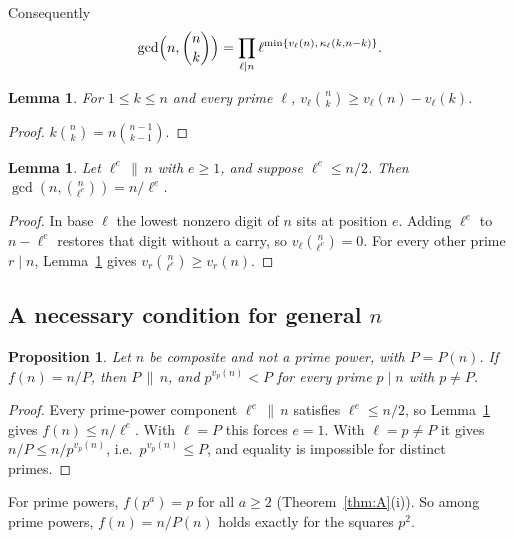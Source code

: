 \documentclass[11pt,a4paper]{article}
\newtheorem{lemma}[theorem]{Lemma}
\newtheorem{proposition}[theorem]{Proposition}
\theoremstyle{definition}
\begin{document}
Consequently
\begin{equation}\label{eq:gcd}
\gcd\Bigl(n,\binom nk\Bigr)=\prod_{\ell\mid n}\ell^{\min\{v_\ell(n),\,\kappa_\ell(k,n-k)\}}.
\end{equation}

\begin{lemma}\label{lem:lower}
For $1\le k\le n$ and every prime $\ell$,
$v_\ell\binom nk\ge v_\ell(n)-v_\ell(k)$.
\end{lemma}
\begin{proof}
$k\binom nk=n\binom{n-1}{k-1}$.
\end{proof}

\begin{lemma}\label{lem:component}
Let $\ell^e\,\|\,n$ with $e\ge1$, and suppose $\ell^e\le n/2$. Then
$\gcd(n,\binom{n}{\ell^e})=n/\ell^e$.
\end{lemma}
\begin{proof}
In base $\ell$ the lowest nonzero digit of $n$ sits at position $e$. Adding $\ell^e$ to
$n-\ell^e$ restores that digit without a carry, so $v_\ell\binom n{\ell^e}=0$. For every
other prime $r\mid n$, Lemma~\ref{lem:lower} gives $v_r\binom n{\ell^e}\ge v_r(n)$.
\end{proof}

\subsection{A necessary condition for general $n$}
\begin{proposition}\label{prop:necessary}
Let $n$ be composite and not a prime power, with $P=P(n)$. If $f(n)=n/P$, then
$P\,\|\,n$, and $p^{v_p(n)}<P$ for every prime $p\mid n$ with $p\ne P$.
\end{proposition}
\begin{proof}
Every prime-power component $\ell^e\,\|\,n$ satisfies $\ell^e\le n/2$, so
Lemma~\ref{lem:component} gives $f(n)\le n/\ell^e$. With $\ell=P$ this forces $e=1$. With
$\ell=p\ne P$ it gives $n/P\le n/p^{v_p(n)}$, i.e.\ $p^{v_p(n)}\le P$, and equality is
impossible for distinct primes.
\end{proof}

For prime powers, $f(p^a)=p$ for all $a\ge2$ (Theorem~\ref{thm:A}(i)). So among prime powers,
$f(n)=n/P(n)$ holds exactly for the squares $p^2$.
\end{document}

